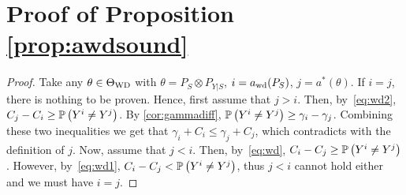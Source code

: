 \section*{Proof of Proposition \ref{prop:awdsound}}
\begin{proof}
	Take any $\theta\in \Theta_{\mathrm{WD}}$ with $\theta = P_S\otimes P_{Y|S}$, $i = a_{\mathrm{wd}}(P_S)$, $j = a^*(\theta)$.
	If $i=j$, there is nothing to be proven. Hence, first assume that $j>i$. Then, by~\eqref{eq:wd2}, $C_j - C_i \ge \mathbb{P}\left(Y^i \ne Y^j\right)$.
	By \cref{cor:gammadiff}, $\mathbb{P}\left(Y^i \ne Y^j \right) \ge \gamma_i - \gamma_j$. Combining these two inequalities we get that
	$\gamma_i + C_i \le \gamma_j + C_j$, which contradicts with the definition of $j$.
	Now, assume that $j<i$. Then, by~\eqref{eq:wd}, $C_i - C_j \ge \mathbb{P}\left(Y^i \ne Y^j\right)$.
	However, by~\eqref{eq:wd1}, $C_i -C_j < \mathbb{P}\left(Y^i \ne Y^j\right)$, thus $j<i$ cannot hold either and we must have $i=j$.
	\end{proof}


